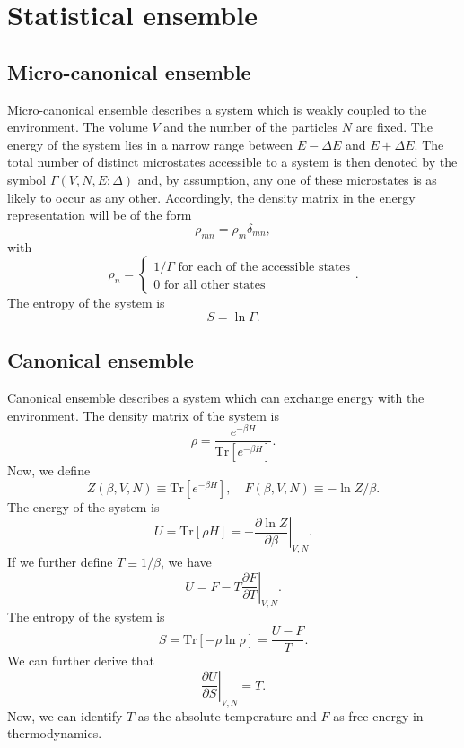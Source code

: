 \section{Statistical ensemble}
\subsection{Micro-canonical ensemble}
Micro-canonical ensemble describes a system which is weakly coupled to the environment. The volume $V$ and the number of the particles $N$ are fixed. The energy of the system lies in a narrow range between $E-\Delta E$ and $E + \Delta E$. The total number of distinct microstates accessible to a system is then denoted by the symbol $\Gamma(V,N,E;\Delta)$ and, by assumption, any one of these microstates is as likely to occur as any other. 
Accordingly, the density matrix in the energy representation will be of the form
\[\rho_{mn} = \rho_m \delta_{mn},\]
with
\[\rho_n = \begin{cases} 1/\Gamma \mbox{ for each of the accessible states} \\ 0 \mbox{ for all other states} \end{cases}.\]
The entropy of the system is
\[S = \ln \Gamma.\]

\subsection{Canonical ensemble}
Canonical ensemble describes a system which can exchange energy with the environment. The density matrix of the system is
\[\rho = \frac{e^{-\beta H}}{\mathrm{Tr}[e^{-\beta H}]}.\]
Now, we define
\[Z(\beta,V,N) \equiv \mathrm{Tr}[e^{-\beta H}] , \quad F(\beta,V,N) \equiv -\ln Z/\beta.\]
The energy of the system is
\[U = \mathrm{Tr}[\rho H] = -\left. \frac{\partial \ln Z}{\partial \beta} \right|_{V,N}.\]
If we further define $T \equiv 1/\beta$, we have
\[U = F - T \left. \frac{\partial F}{\partial T} \right|_{V,N}.\]
The entropy of the system is
\[S = \mathrm{Tr}[-\rho\ln\rho] = \frac{U-F}{T}.\]
We can further derive that
\[\left. \frac{\partial U}{\partial S}\right|_{V,N} = T.\]
Now, we can identify $T$ as the absolute temperature and $F$ as free energy in thermodynamics.

